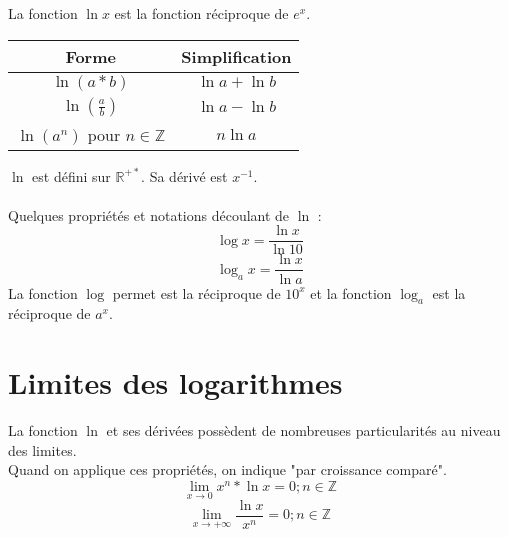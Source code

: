 \documentclass{article}
\begin{document}
	La fonction $\ln x$ est la fonction réciproque de $e^x$. \\
	\begin{center}
		\begin{tabular}{|c|c|}
			\hline
			Forme & Simplification \\
			\hline
			$\ln (a*b)$ & $\ln a + \ln b$ \\
			\hline
			$\ln (\frac{a}{b})$ & $\ln a - \ln b$ \\
			\hline
			$\ln (a^n)$ pour $n\in\mathbb{Z}$ & $n\ln a$ \\
			\hline
		\end{tabular}
	\end{center}
	$\ln$ est défini sur $\mathbb{R}^{+*}$. Sa dérivé est $x^{-1}$. \\
	\\
	Quelques propriétés et notations découlant de $\ln$ :
	\[
		\log x = \frac{\ln x}{\ln 10}
	\]
	\[
		\log_a x = \frac{\ln x}{\ln a}
	\]
	La fonction $\log$ permet est la réciproque de $10^x$ et la fonction $\log_a$ est la réciproque de $a^x$.

	\section{Limites des logarithmes}

	La fonction $\ln$ et ses dérivées possèdent de nombreuses particularités au niveau des limites. \\
	Quand on applique ces propriétés, on indique "par croissance comparé". \\
	\[
		\lim_{x \to 0} x^n*\ln x = 0;n\in\mathbb{Z}
	\]
	\[
		\lim_{x \to +\infty} \frac{\ln x}{x^n} = 0;n\in\mathbb{Z}
	\]
\end{document}
